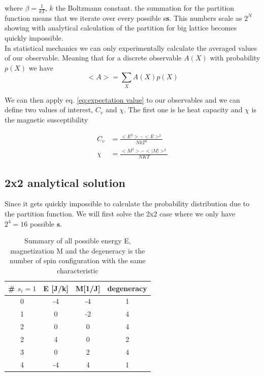 \documentclass[english,notitlepage,reprint,nofootinbib]{revtex4-2}  %
\begin{document}
	where $\beta = \frac{1}{kT}$, $k$ the Boltzmann constant. the summation for the partition
	function means that we iterate over every possible s\textbf{s}. This numbers scale as $2^N$
	showing with analytical calculation of the partition for big lattice becomes quickly 
	impossible. \\
	
	In statistical mechanics we can only experimentally calculate the averaged values of our 
	observable. Meaning that for a discrete observable $A(X)$ with probability $p(X)$ we have 
	\begin{equation}
		<A> = \sum_{X}A(X)p(X) \label{eq:expectation value}
	\end{equation} 
	
	We can then apply eq. \ref{eq:expectation value} to our observables and we can define two 
	values of interest, $C_v$ and $\chi$. The first one is he heat capacity and $\chi$ is the
	magnetic susceptibility 
	
	\begin{align}
		C_v &= \frac{<E^2> - <E>^2}{NkT^2} \label{eq:heat_capacity} \\
		\chi &= \frac{<M^2> - <|M|>^2}{NKT} \label{eq:susceptibility}
	\end{align}
 	
	\subsection{2x2 analytical solution}\label{subsec:analytical solution}
	
	Since it gets quickly impossible to calculate the probability distribution due to the 
	partition function. We will first solve the 2x2 case where we only have $2^4=16$ possible
	$\textbf{s}$. 
	
	\begin{table}[h!]
	\centering
	\begin{tabular}{|c|c|c|c|}
		\hline
		\# $s_i=1$ & E [J/k] & M[1/J] & degeneracy \\
		\hline
		\hline
		0 & -4 &  -4 &  1  \\
		1 & 0&   -2&   4  \\ 
		2 & 0 & 0&  4  \\
		2 & 4 & 0 &  2 \\
		3 & 0  & 2 & 4 \\
		4 & -4 & 4 & 1 \\
		\hline
	\end{tabular}
	\caption{ Summary of all possible energy E, magnetization M and the degeneracy is the 
	number of spin configuration with the same characteristic} \label{tab:summary2x2}
	\end{table} 
	
\end{document}
